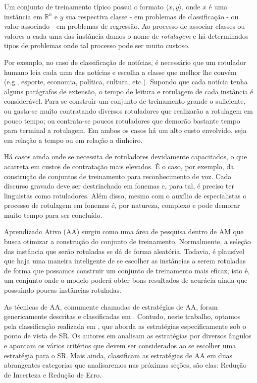 Um conjunto de treinamento típico possui o formato $\langle x,y \rangle$, onde $x$ é uma instância em $\mathbb{R}^n$ e $y$ sua respectiva classe - em problemas de classificação - ou valor associado - em problemas de regressão. Ao processo de associar classes ou valores a cada uma das instância damos o nome de \textit{rotulagem} e há determinados tipos de problemas onde tal processo pode ser muito custoso. 

Por exemplo, no caso de classificação de notícias, é necessário que um rotulador humano leia cada uma das notícias e escolha a classe que melhor lhe convém (e.g., esporte, economia, política, cultura, etc.). Supondo que cada notícia tenha alguns parágrafos de extensão, o tempo de leitura e rotulagem de cada instância é considerável. Para se construir um conjunto de treinamento grande o suficiente, ou gasta-se muito contratando diversos rotuladores que realizarão a rotulagem em pouco tempo; ou contrata-se poucos rotuladores que demorão bastante tempo para terminal a rotulagem. Em ambos os casos há um alto custo envolvido, seja em relação a tempo ou em relação a dinheiro.

Há casos ainda onde se necessita de rotuladores devidamente capacitados, o que acarreta em custos de contratação mais elevados. É o caso, por exemplo, da construção de conjuntos de treinamento para reconhecimento de voz. Cada discurso gravado deve ser destrinchado em fonemas e, para tal, é preciso ter linguistas como rotuladores. Além disso, mesmo com o auxílio de especialistas o processo de rotulagem em fonemas é, por natureza, complexo e pode demorar muito tempo para ser concluído.

Aprendizado Ativo (AA) surgiu como uma área de pesquisa dentro de AM que busca otimizar a construção do conjunto de treinamento. Normalmente, a seleção das instância que serão rotuladas se dá de forma aleatória. Todavia, é plausível que haja uma maneira inteligente de se escolher as instâncias a serem rotuladas de forma que possamos construir um conjunto de treinamento mais eficaz, isto é, um conjunto onde o modelo poderá obter bons resultados de acurácia ainda que possuindo poucas instâncias rotuladas.

As técnicas de AA, comumente chamadas de estratégias de AA, foram genericamente descritas e classificadas em \citep{settles.tr09}. Contudo, neste trabalho, optamos pela classificação realizada em \citep{RubensRecSysHB2010}, que aborda as estratégias especificamente sob o ponto de vista de SR. Os autores em \citep{RubensRecSysHB2010} analisam as estratégias por diversos ângulos e apontam os vários critérios que devem ser considerados ao se escolher uma estratégia para o SR. Mais ainda, \citep{RubensRecSysHB2010} classificam as estratégias de AA em duas abrangentes categorias que analisaremos nas próximas seções, são elas: Redução de Incerteza e Redução de Erro.

